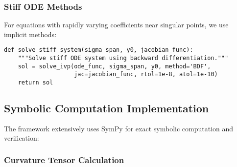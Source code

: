 \subsubsection{Stiff ODE Methods}

For equations with rapidly varying coefficients near singular points, we use implicit methods:

\begin{verbatim}
def solve_stiff_system(sigma_span, y0, jacobian_func):
    """Solve stiff ODE system using backward differentiation."""
    sol = solve_ivp(ode_func, sigma_span, y0, method='BDF',
                    jac=jacobian_func, rtol=1e-8, atol=1e-10)
    return sol
\end{verbatim}

\subsection{Symbolic Computation Implementation}
\label{app:symbolic_computation}

The framework extensively uses SymPy for exact symbolic computation and verification:

\subsubsection{Curvature Tensor Calculation}

